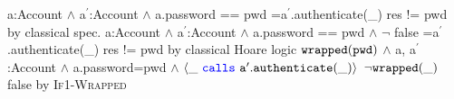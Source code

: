 {
	\begin{proofexample}
			{\proofstepwithrule
				{\hoareEx
						{a:Account $\wedge$ a$^\prime$:Account $\wedge$ a.password == pwd}
						{=a$^\prime$.authenticate(\_)}
						{res != pwd}
						}
					{by classical spec.}
			}
			{\proofstepwithrule
				{\hoareEx
						{a:Account $\wedge$ a$^\prime$:Account $\wedge$ a.password == pwd $\wedge$ $\neg$ false}
						{=a$^\prime$.authenticate(\_)}
						{res != pwd}
						}
					{by classical Hoare logic}
			}
			{\proofstepwithrule
				{\onlyIfSingleExAlt
						{$\texttt{wrapped}( {\texttt{pwd}} )$ $\wedge$ a, a$^\prime$:Account $\wedge$ a.password=pwd $\wedge$ $\langle \_\ {\color{blue}\texttt{calls}}\ {\texttt{a}}^\prime.{\texttt{authenticate}}(\_) \rangle$}
						{$\neg \texttt{wrapped}( \_ )$}
						{false}
						}
					{by \textsc{If1-Wrapped}}
			}
		\endproofsteps
	\end{proofexample}
	}
